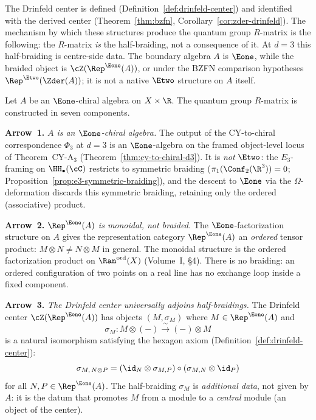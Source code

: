 The Drinfeld center is defined (Definition~\ref{def:drinfeld-center})
and identified with the derived center
(Theorem~\ref{thm:bzfn}, Corollary~\ref{cor:zder-drinfeld}).
The mechanism by which these structures produce the quantum group
$R$-matrix is the following: the $R$-matrix \emph{is} the
half-braiding, not a consequence of it. At $d = 3$ this half-braiding
is centre-side data. The boundary algebra $A$ is $\Eone$, while the
braided object is $\cZ(\Rep^{\Eone}(A))$, or under the BZFN comparison
hypotheses $\Rep^{\Etwo}(\Zder(A))$; it is not a native $\Etwo$
structure on $A$ itself.

\begin{construction}
\label{constr:rmatrix-from-center}
Let $A$ be an $\Eone$-chiral algebra on $X \times \R$. The
quantum group $R$-matrix is constructed in seven components.

\medskip
\noindent\textbf{Arrow~1.}
\textit{$A$ is an $\Eone$-chiral algebra.}
The output of the CY-to-chiral correspondence $\Phi_3$ at $d = 3$ is an
$\Eone$-algebra on the framed object-level locus of Theorem~CY-A$_3$
(Theorem~\ref{thm:cy-to-chiral-d3}).
It is \emph{not} $\Etwo$: the $E_3$-framing on $\HH_\bullet(\cC)$
restricts to symmetric braiding
($\pi_1(\Conf_2(\R^3)) = 0$; Proposition~\ref{prop:e3-symmetric-braiding}),
and the descent to $\Eone$ via the $\Omega$-deformation
discards this symmetric braiding, retaining only the ordered
(associative) product.

\medskip
\noindent\textbf{Arrow~2.}
\textit{$\Rep^{\Eone}(A)$ is monoidal, not braided.}
The $\Eone$-factorization structure on $A$ gives the
representation category $\Rep^{\Eone}(A)$ an \emph{ordered}
tensor product: $M \otimes N \neq N \otimes M$ in general.
The monoidal structure is the ordered factorization product
on $\Ran^{\mathrm{ord}}(X)$ (Volume~I, \S4). There is no
braiding: an ordered configuration of two points on a real line has no
exchange loop inside a fixed component.

\medskip
\noindent\textbf{Arrow~3.}
\textit{The Drinfeld center universally adjoins half-braidings.}
The Drinfeld center $\cZ(\Rep^{\Eone}(A))$ has objects
$(M, \sigma_M)$ where $M \in \Rep^{\Eone}(A)$ and
\begin{equation}
\label{eq:half-braiding-def}
 \sigma_M \colon M \otimes (-) \xrightarrow{\;\sim\;} (-) \otimes M
\end{equation}
is a natural isomorphism satisfying the hexagon axiom
(Definition~\ref{def:drinfeld-center}):
\begin{equation}
\label{eq:hexagon-half-braiding}
 \sigma_{M,\, N \otimes P}
 = (\id_N \otimes \sigma_{M,P}) \circ (\sigma_{M,N} \otimes \id_P)
\end{equation}
for all $N, P \in \Rep^{\Eone}(A)$. The half-braiding
$\sigma_M$ is \emph{additional data}, not given by $A$:
it is the datum that promotes $M$ from a module to a
\emph{central} module (an object of the center).


\end{construction}
